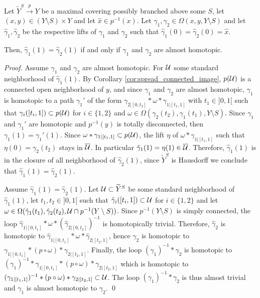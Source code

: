 \begin{lem} \label{lem:almost_homotopic_carac2}
 Let $\widetilde Y^S\xrightarrow{p} Y$ be a maximal covering possibly branched above some $S$, let $(x,y)\in (Y\setminus S)\times Y$ and let $\hat x \in p^{-1}(x)$.
Let $\gamma_1, \gamma_2\in \Omega(x,y,Y\setminus S)$ and let $\hat \gamma_1,\hat\gamma_2$ be the respective lifts of $\gamma_1$ and $\gamma_2$ such that $\hat \gamma_1(0)=\hat \gamma_2(0)=\hat x$. 

Then, $\hat\gamma_1(1)=\hat\gamma_2(1)$ if and only if $\gamma_1$ and $\gamma_2$ are almost homotopic.
\end{lem}
\begin{proof}
 Assume $\gamma_1$ and $\gamma_2$ are almost homotopic. For  $\mathcal{U}$ some standard neighborhood of $\hat\gamma_1(1)$. By Corollary \ref{cor:spread_connected_image}, $p(\mathcal{U})$ is a connected open neighborhood of $y$, and since $\gamma_1$ and $\gamma_2$ are almost homotopic, $\gamma_1$ is homotopic to a path $\gamma_1'$ of the form $\gamma_{2|[0,t_2]}*\omega*\gamma_{1|[t_1,1]}$ with $t_1\in ]0,1[$
 such that $\gamma_i([t_i,1])\subset p(\mathcal{U})$ for $i\in \{1,2\}$ and $\omega\in  \Omega(\gamma_2(t_2),\gamma_1(t_1),Y\setminus S)$. 
 Since $\gamma_1$ and $\gamma_1'$ are homotopic and $p^{-1}(y)$ is totally disconnected, then $\gamma_1(1)=\gamma_1'(1)$. Since $\omega*\gamma_{1|[t_1,1]}\subset p(\mathcal{U})$, the lift $\eta$ of $\omega*\gamma_{1|[t_1,1]}$ such that $\eta(0)=\gamma_2(t_2)$ stays in $\overline {\mathcal{U}}$. In particular $\hat\gamma_1(1)=\eta(1)\in \overline {\mathcal{U}}$. Therefore, $\hat\gamma_1(1)$ is in the closure of all neighborhood of $\hat\gamma_2(1)$, since $\widetilde Y^S$ is Hausdorff we conclude that $\hat\gamma_1(1)=\hat\gamma_2(1)$.
 
 Assume $\hat\gamma_1(1)=\hat\gamma_2(1)$. Let $\mathcal{U}\subset \widetilde Y^S$ be some standard neighborhood of  $\hat\gamma_1(1)$, let $t_1,t_2\in ]0,1[$ such that $\hat\gamma_i([t_i,1])\subset \mathcal{U}$ for $i\in \{1,2\}$ and let $\omega \in \Omega(\hat\gamma_1(t_1),\hat\gamma_2(t_2),\mathcal{U}\cap p^{-1}(Y\setminus S))$. Since $p^{-1}(Y\setminus S)$ is simply connected, the loop $\hat\gamma_{1|[0,t_1]} *\omega * (\hat\gamma_{2|[0,t_2]})^{-1}$ is homotopically trivial. Therefore, $\hat\gamma_2$ is homotopic to $\hat\gamma_{1|[0,t_1]}*\omega*\hat\gamma_{2|[t_2,1]}$, hence $\gamma_2$ is homotopic to $\gamma_{1|[0,t_1]}*(p\circ\omega)*\gamma_{2|[t_2,1]}$. Finally, the loop $(\gamma_1)^{-1}*\gamma_2$ is homotopic to  $(\gamma_1)^{-1}*\gamma_{1|[0,t_1]}*(p\circ\omega)*\gamma_{2|[t_2,1]}$ which is homotopic to $(\gamma_{1|[t_1,1]})^{-1}*(p\circ \omega)*\gamma_{2|[t_2,1]} \subset \mathcal{U}$. 
The loop $(\gamma_1)^{-1}*\gamma_2$ is thus almost trivial and $\gamma_1$ is almost homotopic to $\gamma_2$. 
\qed\end{proof}


